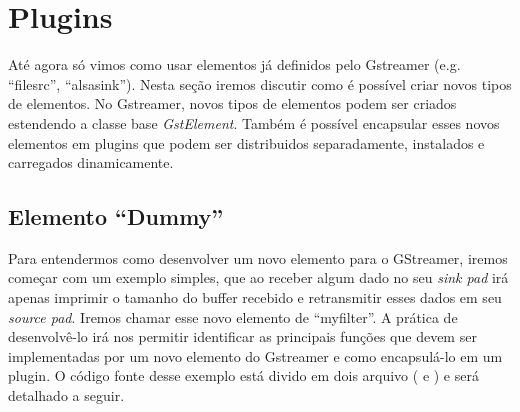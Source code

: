 \section{Plugins}
\label{sec:plugins}


Até agora só vimos como usar elementos já definidos pelo Gstreamer (e.g.
``filesrc'', ``alsasink'').  Nesta seção iremos discutir como é possível criar
novos tipos de elementos.  No Gstreamer, novos tipos de elementos podem ser
criados estendendo a classe base \emph{GstElement}.  Também é possível encapsular
esses novos elementos em plugins que podem ser distribuidos separadamente,
instalados e carregados dinamicamente. 



\subsection*{Elemento ``Dummy''}
Para entendermos como desenvolver um novo elemento para  o GStreamer, iremos
começar com um exemplo simples, que ao receber algum dado no seu \emph{sink
pad} irá apenas imprimir o tamanho do buffer recebido e retransmitir esses
dados em seu \emph{source pad}.  Iremos chamar esse novo elemento de
``myfilter''.  A prática de desenvolvê-lo irá nos permitir identificar as
principais funções que devem ser implementadas por um novo elemento do
Gstreamer e como encapsulá-lo em um plugin.  O código fonte desse exemplo está
divido em dois arquivo ( e ) e será detalhado a
seguir.

